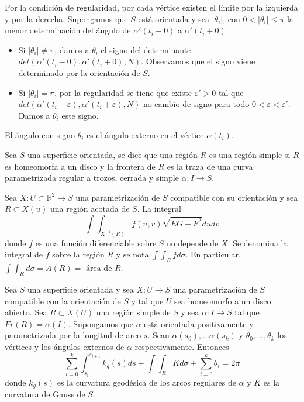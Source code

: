 \begin{definition}
    Por la condición de regularidad, por cada vértice existen el límite por la izquierda y por la derecha.
    Supongamos que $S$ está orientada y sea $|\theta_i|$, con $0 < |\theta_i| \leq \pi$ la menor determinación del ángulo de $\alpha'(t_i - 0)$ a $\alpha'(t_i + 0)$.
    \begin{itemize}
        \item Si $|\theta_i| \neq \pi$, damos a $\theta_i$ el signo del determinante $det(\alpha'(t_i-0), \alpha'(t_i+0), N)$.
              Observamos que el signo viene determinado por la orientación de $S$.
        \item Si $|\theta_i| = \pi$, por la regularidad se tiene que existe $\varepsilon'>0$ tal que $det(\alpha'(t_i-\varepsilon), \alpha'(t_i+\varepsilon), N)$ no cambio de signo para todo $0 < \varepsilon < \varepsilon'$.
              Damos a $\theta_i$ este signo.
    \end{itemize}
    El ángulo con signo $\theta_i$ es el ángulo externo en el vértice $\alpha(t_i)$.
\end{definition}

\begin{definition}
    Sea $S$ una superficie orientada, se dice que una región $R$ es una región simple si $R$ es homeomorfa a un disco y la frontera de $R$ es la traza de una curva parametrizada regular a trozos, cerrada y simple $\alpha: I \to S$.
\end{definition}

\begin{definition}
    Sea $X: U \subset \mathbb{R}^2 \to S$ una parametrización de $S$ compatible con su orientación y sea $R \subset X(u)$ una región acotada de $S$.
    La integral $$\int\int_{X^{-1}(R)} f(u, v) \sqrt{EG-F^2} dudv$$ donde $f$ es una función diferenciable sobre $S$ no depende de $X$.
    Se denomina la integral de $f$ sobre la región $R$ y se nota $\int\int_R f d\sigma$.
    En particular, $\int\int_R d\sigma = A(R) = \text{ área de } R$.
\end{definition}

\begin{theorem}
    Sea $S$ una superficie orientada y sea $X: U \to S$ una parametrización de $S$ compatible con la orientación de $S$ y tal que $U$ sea homeomorfo a un disco abierto.
    Sea $R \subset X(U)$ una región simple de $S$ y sea $\alpha: I \to S$ tal que $Fr(R) = \alpha(I)$.
    Supongamos que $\alpha$ está orientada positivamente y parametrizada por la longitud de arco $s$.
    Sean $\alpha(s_0), \dots \alpha(s_k)$ y $\theta_0, \dots, \theta_k$ los vértices y los ángulos externos de $\alpha$ respectivamente.
    Entonces
    $$\sum_{i=0}^k \int_{s_i}^{s_{i+1}} k_g(s) ds + \int\int_R K d\sigma + \sum_{i=0}^k \theta_i = 2\pi$$
    donde $k_g(s)$ es la curvatura geodésica de los arcos regulares de $\alpha$ y $K$ es la curvatura de Gauss de $S$.
\end{theorem}